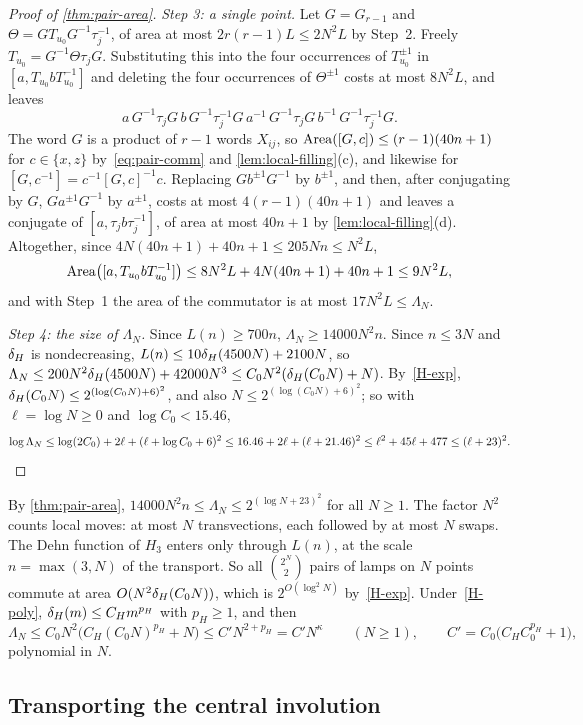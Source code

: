 \begin{proof}[Proof of \cref{thm:pair-area}]
\emph{Step 3: a single point.} Let $G=G_{r-1}$ and $\Theta=GT_{u_0}G^{-1}\tau_j^{-1}$, of area at most $2r(r-1)L\le2N^2L$ by Step~2. Freely
$T_{u_0}=G^{-1}\Theta\tau_jG$. Substituting this into the four occurrences of $T_{u_0}^{\pm1}$ in $[a,T_{u_0}bT_{u_0}^{-1}]$ and deleting the
four occurrences of $\Theta^{\pm1}$ costs at most $8N^2L$, and leaves
\[
a\,G^{-1}\tau_jG\,b\,G^{-1}\tau_j^{-1}G\,a^{-1}\,G^{-1}\tau_jG\,b^{-1}\,G^{-1}\tau_j^{-1}G .
\]
The word $G$ is a product of $r-1$ words $X_{ij}$, so $\operatorname{Area}([G,c])\le(r-1)(40n+1)$ for $c\in\{x,z\}$ by~\eqref{eq:pair-comm} and
\cref{lem:local-filling}(c), and likewise for $[G,c^{-1}]=c^{-1}[G,c]^{-1}c$. Replacing $Gb^{\pm1}G^{-1}$ by $b^{\pm1}$, and then, after
conjugating by $G$, $Ga^{\pm1}G^{-1}$ by $a^{\pm1}$, costs at most $4(r-1)(40n+1)$ and leaves a conjugate of $[a,\tau_jb\tau_j^{-1}]$, of
area at most $40n+1$ by \cref{lem:local-filling}(d). Altogether, since $4N(40n+1)+40n+1\le205Nn\le N^2L$,
\[
\operatorname{Area}\bigl([a,T_{u_0}bT_{u_0}^{-1}]\bigr)\le8N^2L+4N(40n+1)+40n+1\le9N^2L,
\]
and with Step~1 the area of the commutator is at most $17N^2L\le\Lambda_N$.

\emph{Step 4: the size of $\Lambda_N$.} Since $L(n)\ge700n$, $\Lambda_N\ge14000N^2n$. Since $n\le3N$ and $\delta_{H}$ is nondecreasing,
$L(n)\le10\delta_{H}(4500N)+2100N$, so $\Lambda_N\le200N^2\delta_{H}(4500N)+42000N^3\le C_0N^2(\delta_{H}(C_0N)+N)$. By~\ref{H-exp},
$\delta_{H}(C_0N)\le2^{(\log(C_0N)+6)^2}$, and also $N\le2^{(\log(C_0N)+6)^2}$; so with $\ell=\log N\ge0$ and $\log C_0<15.46$,
\[
\log\Lambda_N\le\log(2C_0)+2\ell+(\ell+\log C_0+6)^2\le16.46+2\ell+(\ell+21.46)^2\le\ell^2+45\ell+477\le(\ell+23)^2 .
\qedhere
\]
\end{proof}

\begin{remark}\label{rem:pair-growth}
By \cref{thm:pair-area}, $14000N^2n\le\Lambda_N\le2^{(\log N+23)^2}$ for all $N\ge1$. The factor $N^2$ counts local moves: at most $N$
transvections, each followed by at most $N$ swaps. The Dehn function of $H_3$ enters only through $L(n)$, at the scale $n=\max(3,N)$ of the
transport. So all $\binom{2^N}2$ pairs of lamps on $N$ points commute at area $O(N^2\delta_{H}(C_0N))$, which is $2^{O(\log^2N)}$ by~\ref{H-exp}.
Under~\ref{H-poly}, $\delta_{H}(m)\le C_Hm^{p_H}$ with $p_H\ge1$, and then
\[
\Lambda_N\le C_0N^2\bigl(C_H(C_0N)^{p_H}+N\bigr)\le C'N^{2+p_H}=C'N^{\kappa}\qquad(N\ge1),\qquad C'=C_0\bigl(C_HC_0^{p_H}+1\bigr),
\]
polynomial in $N$.
\end{remark}

\subsection{Transporting the central involution}\label{sec:pair-J}

